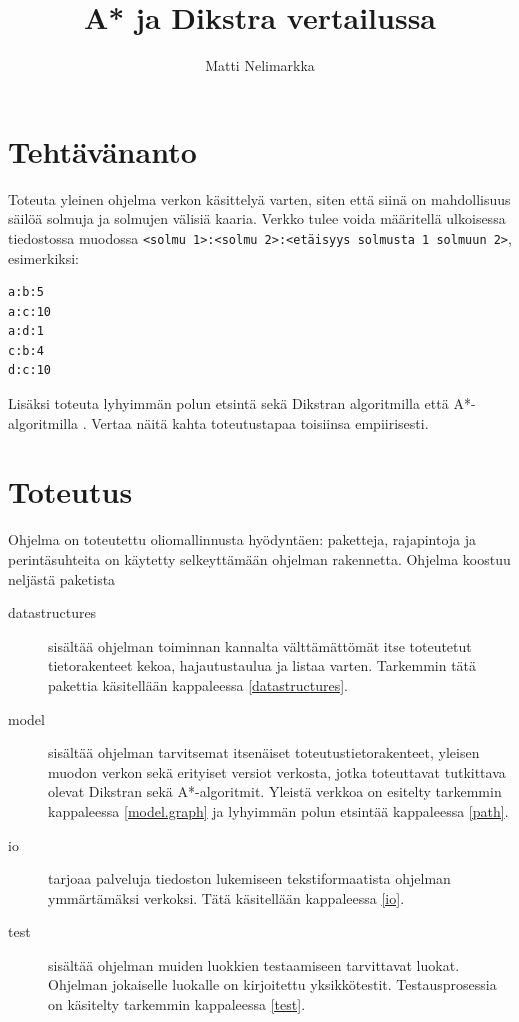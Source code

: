 \documentclass[10pt,a4paper]{article}
\begin{document}
\title{A* ja Dikstra vertailussa}
\author{Matti Nelimarkka}

\setlength{\parindent}{0pt}
\setlength{\parskip}{1ex}

\maketitle

\newpage

\section*{Tehtävänanto}

Toteuta yleinen ohjelma verkon käsittelyä varten, siten että siinä on mahdollisuus säilöä solmuja ja solmujen välisiä kaaria. Verkko tulee voida määritellä ulkoisessa tiedostossa muodossa \texttt{<solmu 1>:<solmu 2>:<etäisyys solmusta 1 solmuun 2>}, esimerkiksi:

\begin{verbatim}
a:b:5
a:c:10
a:d:1
c:b:4
d:c:10
\end{verbatim}

Lisäksi toteuta lyhyimmän polun etsintä sekä Dikstran algoritmilla \cite{dikstra} että A*-algoritmilla \cite{astar}. Vertaa näitä kahta toteutustapaa toisiinsa empiirisesti.

\section{Toteutus}

Ohjelma on toteutettu oliomallinnusta hyödyntäen: paketteja, rajapintoja ja perintäsuhteita on käytetty selkeyttämään ohjelman rakennetta. Ohjelma koostuu neljästä paketista

\begin{description}
\item[datastructures] sisältää ohjelman toiminnan kannalta välttämättömät itse toteutetut tietorakenteet kekoa, hajautustaulua ja listaa varten. Tarkemmin tätä pakettia käsitellään kappaleessa \ref{datastructures}.
\item[model] sisältää ohjelman tarvitsemat itsenäiset toteutustietorakenteet, yleisen muodon verkon sekä erityiset versiot verkosta, jotka toteuttavat tutkittava olevat Dikstran sekä A*-algoritmit. Yleistä verkkoa on esitelty tarkemmin kappaleessa \ref{model.graph} ja lyhyimmän polun etsintää kappaleessa \ref{path}.
\item[io] tarjoaa palveluja tiedoston lukemiseen tekstiformaatista ohjelman ymmärtämäksi verkoksi. Tätä käsitellään kappaleessa \ref{io}.
\item[test] sisältää ohjelman muiden luokkien testaamiseen tarvittavat luokat. Ohjelman jokaiselle luokalle on kirjoitettu yksikkötestit. Testausprosessia on käsitelty tarkemmin kappaleessa \ref{test}.
\end{description}
\end{document}
